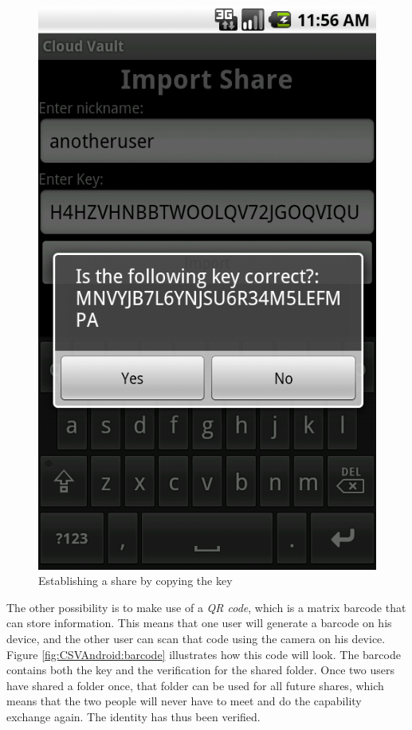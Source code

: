 \documentclass[pdftex,english,10pt,b5paper,twoside]{book}
\begin{document}
\begin{figure}[h!]
    \centering
    \includegraphics[scale=0.4]{client-manualimport.png}
    \caption{Establishing a share by copying the key}
    \label{fig:CSVAndroid:manualimport}
\end{figure}

The other possibility is to make use of a \emph{\ac{QR} code}, which is a
matrix barcode that can store information. This means that one user will
generate a barcode on his device, and the other user can scan that code using
the camera on his device. Figure \ref{fig:CSVAndroid:barcode} illustrates how
this code will look. The barcode contains both the key and the verification for
the shared folder. Once two users have shared a folder once, that folder can be
used for all future shares, which means that the two people will never have to
meet and do the capability exchange again. The identity has thus been verified.
\end{document}
